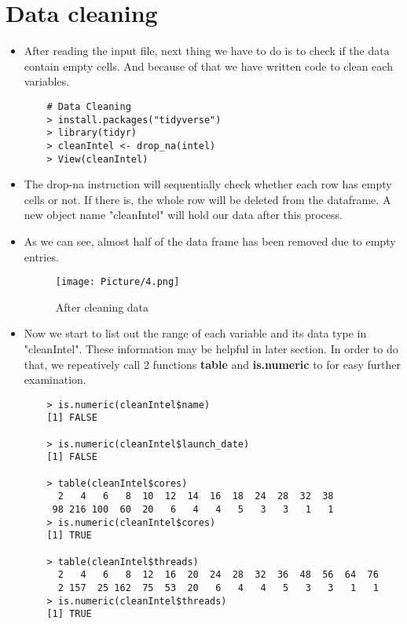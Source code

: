 \documentclass[a4paper]{article}
\begin{document}
\section{Data cleaning}
\begin{itemize}
    
    \item[]After reading the input file, next thing we have to do is to check if the data contain empty cells. And because of that we have written code to clean each variables.
    \begin{lstlisting}
    # Data Cleaning
    > install.packages("tidyverse")
    > library(tidyr)
    > cleanIntel <- drop_na(intel)
    > View(cleanIntel)
    \end{lstlisting}
    
    \item[] The drop-na instruction will sequentially check whether each row has empty cells or not. If there is, the whole row will be deleted from the dataframe. A new object name "cleanIntel" will hold our data after this process.
    
    \item[] As we can see, almost half of the data frame has been removed due to empty entries.

    \begin{figure}[H]
        \centering
        \texttt{[image: Picture/4.png]}
        \caption{After cleaning data}
        \label{4.1}
    \end{figure}
    
    \item[] Now we start to list out the range of each variable and its data type in "cleanIntel". These information may be helpful in later section. In order to do that, we repeatively call 2 functions \textbf{table} and \textbf{is.numeric} to for easy further examination.
    
    \begin{lstlisting}
    > is.numeric(cleanIntel$name)
    [1] FALSE
    
    > is.numeric(cleanIntel$launch_date)
    [1] FALSE
    
    > table(cleanIntel$cores)
      2   4   6   8  10  12  14  16  18  24  28  32  38 
     98 216 100  60  20   6   4   4   5   3   3   1   1 
    > is.numeric(cleanIntel$cores)
    [1] TRUE
    
    > table(cleanIntel$threads)
      2   4   6   8  12  16  20  24  28  32  36  48  56  64  76 
      2 157  25 162  75  53  20   6   4   4   5   3   3   1   1 
    > is.numeric(cleanIntel$threads)
    [1] TRUE
    

\end{lstlisting}
\end{itemize}
\end{document}
